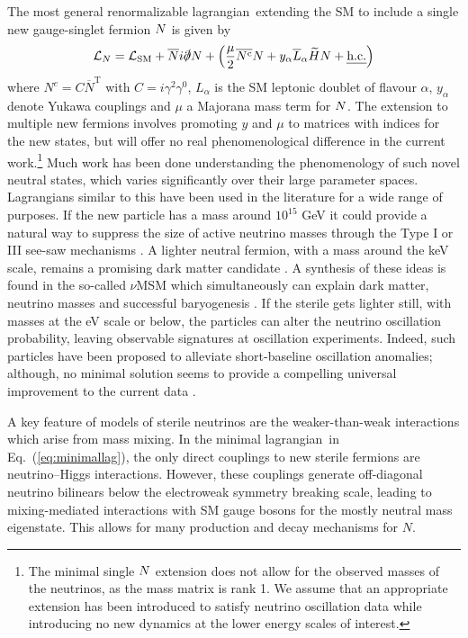 \documentclass[11pt, a4paper]{article}
\newcommand{\refeq}[1]{Eq.~(\ref{#1})}
\def\lagrangian{lagrangian}
\def\ster{\ensuremath N}
\begin{document}
The most general renormalizable \lagrangian\ extending the SM to include a
single new gauge-singlet fermion $\ster$ is given by
%
\begin{align}   \mathcal{L}_N = \mathcal{L}_\text{SM} +
\overline{\ster}i\slashed{\partial}\ster + \left(\frac{\mu}{2}
\overline{\ster^\text{c}}\ster  + y_\alpha\overline{L}_\alpha\widetilde{H}
\ster + \text{\emph{h.c.}}\right)\label{eq:minimallag} \end{align}
%
where $N^c=C\overline{N}^\text{T}$ with $C=i\gamma^2\gamma^0$, $L_\alpha$ is
the SM leptonic doublet of flavour $\alpha$, $y_\alpha$ denote Yukawa couplings
and $\mu$ a Majorana mass term for $\ster$. The extension to multiple new
fermions involves promoting $y$ and $\mu$ to matrices with indices for the new
states, but will offer no real phenomenological difference in the current
work.\footnote{The minimal single $\ster$ extension does not allow for the
observed masses of the neutrinos, as the mass matrix is rank 1. We assume that
an appropriate extension has been introduced to satisfy neutrino oscillation
data while introducing no new dynamics at the lower energy scales of interest.}
Much work has been done understanding the phenomenology of such novel neutral
states, which varies significantly over their large parameter spaces. 
%
Lagrangians similar to this have been used in the literature for a wide range
of purposes. If the new particle has a mass around $10^{15}$ GeV it could
provide a natural way to suppress the size of active neutrino masses through
the Type I or III see-saw mechanisms \cite{Minkowski:1977sc, GellMann:1980vs,
Mohapatra:1979ia}. A lighter neutral fermion, with a mass around the keV scale,
remains a promising dark matter candidate \cite{Adhikari:2016bei}. A synthesis
of these ideas is found in the so-called $\nu$MSM which simultaneously can
explain dark matter, neutrino masses and successful baryogenesis
\cite{Asaka:2005pn}. 
%
If the sterile gets lighter still, with masses at the eV scale or below, the
particles can alter the neutrino oscillation probability, leaving observable
signatures at oscillation experiments. Indeed, such particles have been
proposed to alleviate short-baseline oscillation anomalies; although, no
minimal solution seems to provide a compelling universal improvement to the
current data \cite{Kopp:2013vaa,Conrad:2012qt}.

A key feature of models of sterile neutrinos are the weaker-than-weak
interactions which arise from mass mixing. In the minimal \lagrangian\ in
\refeq{eq:minimallag}, the only direct couplings to new sterile fermions are
neutrino--Higgs interactions. However, these couplings generate off-diagonal
neutrino bilinears below the electroweak symmetry breaking scale, leading to
mixing-mediated interactions with SM gauge bosons for the mostly neutral mass
eigenstate. This allows for many production and decay mechanisms for $N$. 
\end{document}
